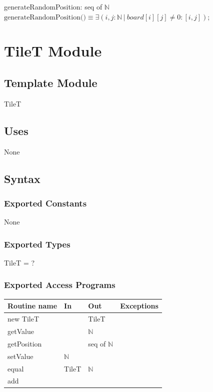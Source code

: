 \documentclass[12pt]{article}
\begin{document}
\noindent generateRandomPosition: seq of $\mathbb{N}$\\
\noindent $\mbox{generateRandomPosition()} \equiv \exists (i,j : \mathbb{N}\ |\ board[i][j] \neq 0 : [i,j])$; 
\newpage




\newpage

\section* {TileT Module}

\subsection*{Template Module}
TileT

\subsection* {Uses}

None

\subsection* {Syntax}

\subsubsection* {Exported Constants}

None

\subsubsection* {Exported Types}

TileT = ?

\subsubsection* {Exported Access Programs}

\begin{tabular}{| l | l | l | p{5cm} |}
  \hline
  \textbf{Routine name} & \textbf{In} & \textbf{Out} & \textbf{Exceptions}\\
  \hline
  new TileT & & TileT & \\
  \hline
  getValue & & $\mathbb{N}$ & ~\\
  \hline
  getPosition & & seq of $\mathbb{N}$ & ~\\
  \hline
  setValue & $\mathbb{N}$ & & ~\\
  \hline
  equal & TileT & $\mathbb{N}$ & ~\\
  \hline
  add & & & ~\\
  \hline
  
\end{tabular}
\end{document}
